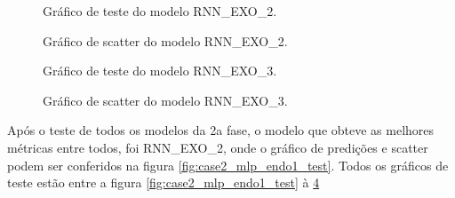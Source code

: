 \documentclass[	12pt, Times, openright, twoside, a4paper, english, brazil]{abntex2}
\begin{document}
            \begin{figure}[!ht]
              \caption{Gráfico de teste do modelo RNN\_EXO\_2. \label{fig:case2_rnn_exo2_test} }
            \end{figure}
            \begin{figure}[!ht]
              \caption{Gráfico de scatter do modelo  RNN\_EXO\_2. \label{fig:case2_rnn_exo2_test_scatter} }
            \end{figure}
              
            \begin{figure}[!ht]
              \caption{Gráfico de teste do modelo RNN\_EXO\_3. \label{fig:case2_rnn_exo3_test} }
            \end{figure}
            \begin{figure}[!ht]
              \caption{Gráfico de scatter do modelo  RNN\_EXO\_3. \label{fig:case2_rnn_exo3_test_scatter} }
\end{figure}
    	    Após o teste de todos os modelos da 2a fase, o modelo que obteve as melhores métricas entre todos, foi RNN\_EXO\_2, onde o gráfico de predições e scatter podem ser conferidos na figura \ref{fig:case2_mlp_endo1_test}.
    	    Todos os gráficos de teste estão entre a figura \ref{fig:case2_mlp_endo1_test} à \ref{fig:case2_rnn_exo3_test_scatter}
\end{document}

